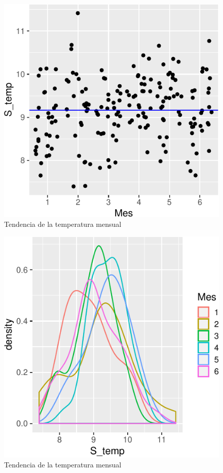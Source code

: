 \documentclass[letterpaper,9pt,twocolumn,twoside,]{pinp}
\begin{document}
\begin{figure}

{\centering \includegraphics{report_hidrolgy_files/figure-latex/unnamed-chunk-3-1} 

}

\caption{Tendencia de la temperatura mensual}\label{fig:unnamed-chunk-31}
\end{figure}
\begin{figure}

{\centering \includegraphics{report_hidrolgy_files/figure-latex/unnamed-chunk-3-2} 

}

\caption{Tendencia de la temperatura mensual}\label{fig:unnamed-chunk-32}
\end{figure}
\end{document}
